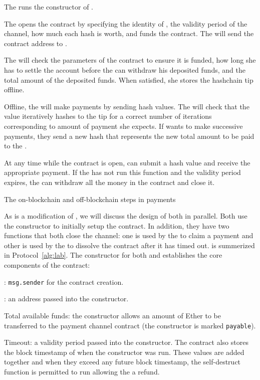 \begin{Protocol*}[t!]
	 \begin{framed} \footnotesize
		\begin{compactlistn}
			\item The \make runs the constructor of \ew.
			\item The \make opens the contract by specifying the identity of \take, the validity period of the channel, how much each hash is worth, and funds the contract. The \make will send the contract address to \take. 
			\item The \take will check the parameters of the contract to ensure it is funded, how long she has to settle the account before the \make can withdraw his deposited funds, and the total amount of the deposited funds. When satisfied, she stores the hashchain tip offline.
			\item Offline, the \make will make payments by sending hash values. The \take will check that the value iteratively hashes to the tip for a correct number of iterations corresponding to amount of payment she expects. If \make wants to make successive payments, they send a new hash that represents the new total amount to be paid to the \take.
			\item At any time while the contract is open, \take can submit a hash value and receive the appropriate payment. If the \take has not run this function and the validity period expires, the \make can withdraw all the money in the contract and close it.
		\end{compactlistn}
		\normalsize \end{framed}
	\caption{The on-blockchain and off-blockchain steps in \ew payments~\label{alg:lab}}
\end{Protocol*}

As \ew is a modification of \fifty, we will discuss the design of both in parallel. Both use the constructor to initially setup the contract. In addition, they have two functions that both close the channel: one is used by the \take to claim a payment and other is used by the \make to dissolve the contract after it has timed out. \ew is summerized in Protocol~\ref{alg:lab}. The constructor for both \fifty and \ew establishes the core components of the contract:

\begin{compactlist}
\item \take: \texttt{msg.sender} for the contract creation.
\item \make: an address passed into the constructor.
\item Total available funds: the constructor allows an amount of Ether to be transferred to the payment channel contract (the constructor is marked \texttt{payable}).
\item Timeout: a validity period passed into the constructor. The contract also stores the block timestamp of when the constructor was run. These values are added together and when they exceed any future block timestamp, the self-destruct function is permitted to run allowing the \make a refund.
\end{compactlist}

